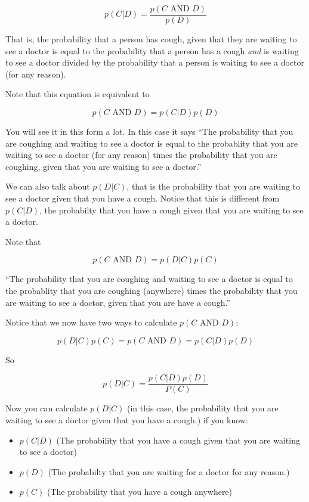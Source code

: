 $$p( C | D) = \frac{ p(C \text{ AND } D)}{ p(D) }$$

That is, the probability that a person has cough, given that they are
waiting to see a doctor is equal to the probability that a person has
a cough \textit{and} is waiting to see a doctor divided by the
probability that a person is waiting to see a doctor (for any reason).

Note that this equation is equivalent to

$$p(C \text{ AND } D) = p(C | D) p(D)$$

You will see it in this form a lot.  In this case it says
``The probability that you are coughing and waiting to see a doctor is
equal to the probablity that you are waiting to see a doctor (for any reason) times the
probability that you are coughing, given that you are waiting to see a
doctor.''

We can also talk about $p(D | C)$, that is the probability that you
are waiting to see a doctor given that you have a cough. Notice that
this is different from $p(C | D)$, the probabilty that you have a
cough given that you are waiting to see a doctor.

Note that 

$$p(C \text{ AND } D) = p(D | C) p(C)$$

``The probability that you are coughing and waiting to see a doctor is
equal to the probablity that you are coughing (anywhere) times the
probability that you are waiting to see a doctor, given that you are
have a cough.''

Notice that we now have two ways to calculate $p(C \text{ AND } D)$:

$$p(D | C) p(C) = p(C \text{ AND } D) = p(C | D) p(D)$$

So

$$p(D | C) = \frac {p(C | D)p(D)}{P(C)}$$

Now you can calculate $p(D | C)$ (in this case, the probability that
you are waiting to see a doctor given that you have a cough.) if you
know:

\begin{itemize}
\item $p(C | D)$ (The probability that you have a cough given that you are waiting to see a doctor)
\item $p(D)$ (The probabilty that you are waiting for a doctor for any reason.)
\item $p(C)$ (The probability that you have a cough anywhere)
\end{itemize}


